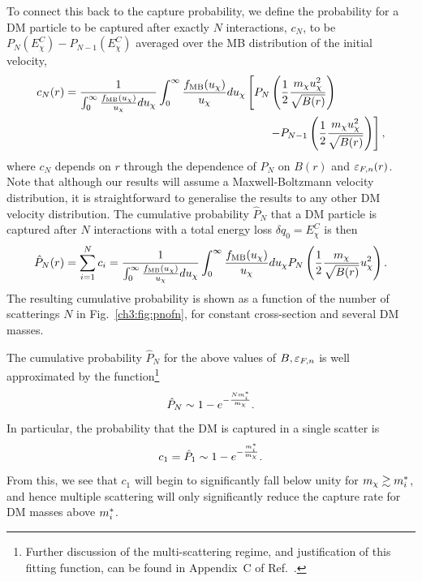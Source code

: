 To connect this back to the capture probability, we define the probability for a DM particle to be captured after exactly $N$ interactions, $c_N$, to be $P_N(E^C_\chi) - P_{N-1}(E^C_\chi)$ averaged over the MB distribution of the initial velocity,
\begin{equation}
    \begin{split}
        c_N(r) &= \frac{1}{\int_0^\infty \frac{\fMB(u_\chi)}{u_\chi}du_\chi}\int_0^\infty \frac{\fMB(u_\chi)}{u_\chi}du_\chi \left[P_N\left(\frac{1}{2}\frac{m_\chi u_\chi^2}{\sqrt{B(r)}}\right)\right.\\
        &\hspace{18em}\left. -P_{N-1}\left(\frac{1}{2}\frac{m_\chi u_\chi^2}{\sqrt{B(r)}}\right)\right], 
    \end{split}
\end{equation}
where $c_N$ depends on $r$ through the dependence of $P_N$  on $B(r)$ and $\varepsilon_{F,n}(r)$. Note that although our results will assume a Maxwell-Boltzmann velocity distribution, it is straightforward to generalise the results to any other DM velocity distribution. The cumulative probability $\hat{P}_N$ that a DM particle is captured after $N$ interactions with a total energy loss  $\delta q_0=E_\chi^C$ is then
\begin{equation}
\hat{P}_N(r) = \sum_{i=1}^N c_i = \frac{1}{\int_0^\infty \frac{f_{\rm MB}(u_\chi)}{u_\chi}du_\chi}\int_0^\infty \frac{f_{\rm MB}(u_\chi)}{u_\chi}du_\chi P_N\left(\frac{1}{2}\frac{m_\chi}{\sqrt{B(r)}} u_\chi^2\right).
\end{equation}
%
The resulting cumulative probability is shown as a function of the number of scatterings $N$ in Fig.~\ref{ch3:fig:pnofn}, for constant cross-section and several DM masses. 

The cumulative probability $\hat{P}_N$ for the above values of $B,\varepsilon_{F,n}$ is well approximated by the function\footnote{Further discussion of the multi-scattering regime, and justification of this fitting function, can be found in Appendix~C of Ref.~\cite{Bell:2020jou_sep_ImprovedTreatmentDark}.}
\begin{equation}
\hat{P}_N \sim  1-e^{-\frac{N m_i^*}{m_\chi}}.\label{ch3:eq:pncum}
\end{equation}
In particular, the probability that the DM is captured in a single scatter is 
\begin{equation}
c_1=\hat{P}_1 \sim  1-e^{-\frac{m_i^*}{m_\chi}}.
\label{ch3:eq:c1}
\end{equation}
From this, we see that $c_1$ will begin to significantly fall below unity for $m_\chi \gtrsim m_i^*$, and hence multiple scattering will only significantly reduce the capture rate for DM masses above $m_i^*$. 


